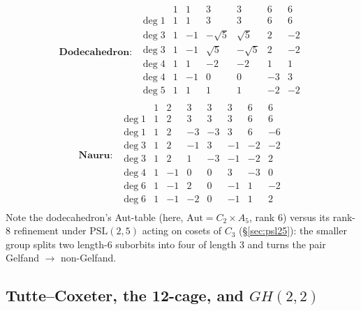 \documentclass[11pt]{article}
\theoremstyle{remark}
\begin{document}
\[
\textbf{Dodecahedron}:\;
\begin{array}{l|rrrrrr}
 & 1 & 1 & 3 & 3 & 6 & 6\\
\hline
\deg 1 & 1 & 1 & 3 & 3 & 6 & 6\\
\deg 3 & 1 & -1 & -\sqrt5 & \sqrt5 & 2 & -2\\
\deg 3 & 1 & -1 & \sqrt5 & -\sqrt5 & 2 & -2\\
\deg 4 & 1 & 1 & -2 & -2 & 1 & 1\\
\deg 4 & 1 & -1 & 0 & 0 & -3 & 3\\
\deg 5 & 1 & 1 & 1 & 1 & -2 & -2\\
\end{array}
\]
\[
\textbf{Nauru}:\;
\begin{array}{l|rrrrrrr}
 & 1 & 2 & 3 & 3 & 3 & 6 & 6\\
\hline
\deg 1 & 1 & 2 & 3 & 3 & 3 & 6 & 6\\
\deg 1 & 1 & 2 & -3 & -3 & 3 & 6 & -6\\
\deg 3 & 1 & 2 & -1 & 3 & -1 & -2 & -2\\
\deg 3 & 1 & 2 & 1 & -3 & -1 & -2 & 2\\
\deg 4 & 1 & -1 & 0 & 0 & 3 & -3 & 0\\
\deg 6 & 1 & -1 & 2 & 0 & -1 & 1 & -2\\
\deg 6 & 1 & -1 & -2 & 0 & -1 & 1 & 2\\
\end{array}
\]
Note the dodecahedron's Aut-table (here, $\mathrm{Aut}=C_2\times A_5$,
rank 6) versus its rank-8 refinement under $\mathrm{PSL}(2,5)$ acting on
cosets of $C_3$ (\S\ref{sec:psl25}): the smaller group splits two
length-6 suborbits into four of length 3 and turns the pair Gelfand
$\to$ non-Gelfand.

\subsection{Tutte--Coxeter, the 12-cage, and $GH(2,2)$}
\end{document}
